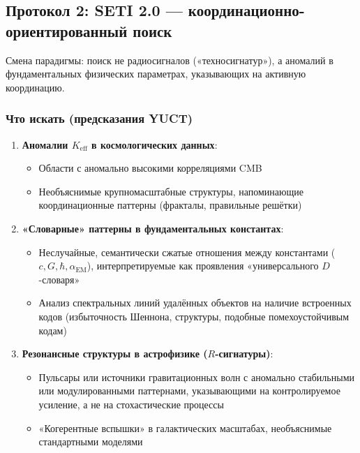\documentclass[12pt,a4paper]{article}
\newcommand{\eff}{\mathrm{eff}}
\newcommand{\Ke}{K_{\eff}}
\begin{document}
	\subsection{Протокол 2: SETI 2.0 — координационно-ориентированный поиск}
	
	Смена парадигмы: поиск не радиосигналов («техносигнатур»), а аномалий в фундаментальных физических параметрах, указывающих на активную координацию.
	
	\subsubsection{Что искать (предсказания YUCT)}
	
	\begin{enumerate}
		\item \textbf{Аномалии \(\Ke\) в космологических данных}:
		\begin{itemize}
			\item Области с аномально высокими корреляциями CMB
			\item Необъяснимые крупномасштабные структуры, напоминающие координационные паттерны (фракталы, правильные решётки)
		\end{itemize}
		
		\item \textbf{«Словарные» паттерны в фундаментальных константах}:
		\begin{itemize}
			\item Неслучайные, семантически сжатые отношения между константами (\(c, G, \hbar, \alpha_{\mathrm{EM}}\)), интерпретируемые как проявления «универсального \(D\)-словаря»
			\item Анализ спектральных линий удалённых объектов на наличие встроенных кодов (избыточность Шеннона, структуры, подобные помехоустойчивым кодам)
		\end{itemize}
		
		\item \textbf{Резонансные структуры в астрофизике (\(R\)-сигнатуры)}:
		\begin{itemize}
			\item Пульсары или источники гравитационных волн с аномально стабильными или модулированными паттернами, указывающими на контролируемое усиление, а не на стохастические процессы
			\item «Когерентные вспышки» в галактических масштабах, необъяснимые стандартными моделями
		\end{itemize}
	\end{enumerate}
	
\end{document}
